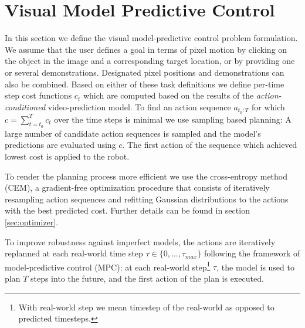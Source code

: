 \section{Visual Model Predictive Control}\label{sec:prelim}
\label{sec:vmpc}
In this section we define the visual model-predictive control problem formulation.  We assume that the user defines a goal in terms of pixel motion by clicking on the object in the image and a corresponding target location, or by providing one or several demonstrations. Designated pixel positions and demonstrations can also be combined. Based on either of these task definitions we define per-time step cost functions $c_t$ which are computed based on the results of the \emph{action-conditioned} video-prediction model. To find an action sequence $a_{t_0:T}$ for which $c = \sum^{T}_{t=t_0}{c_t}$ over the time steps is minimal we use sampling based planning: A large number of candidate action sequences is sampled and the model's predictions are evaluated using $c$. The first action of the sequence which achieved lowest cost is applied to the robot.

To render the planning process more efficient we use the cross-entropy method (CEM), a gradient-free optimization procedure that consists of iteratively resampling action sequences and refitting Gaussian distributions to the actions with the best predicted cost. Further details can be found in section \ref{sec:optimizer}.

To improve robustness against imperfect models, the actions are iteratively replanned at each real-world time step $\tau \in \{0,...,\tau_{max}\}$ following the framework of model-predictive control (MPC): at each real-world step\footnote{With real-world step we mean timestep of the real-world as opposed to predicted timesteps.} $\tau$, the model is used to plan $T$ steps into the future, and the first action of the plan is executed.




